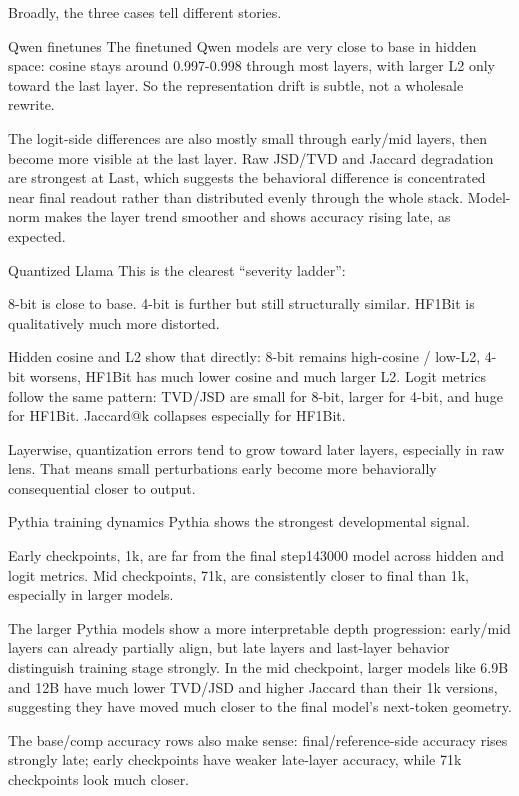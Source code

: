 Broadly, the three cases tell different stories.

Qwen finetunes
The finetuned Qwen models are very close to base in hidden space: cosine stays around 0.997-0.998 through most layers, with larger L2 only toward the last layer. So the representation drift is subtle, not a wholesale rewrite.

The logit-side differences are also mostly small through early/mid layers, then become more visible at the last layer. Raw JSD/TVD and Jaccard degradation are strongest at Last, which suggests the behavioral difference is concentrated near final readout rather than distributed evenly through the whole stack. Model-norm makes the layer trend smoother and shows accuracy rising late, as expected.

Quantized Llama
This is the clearest “severity ladder”:

8-bit is close to base.
4-bit is further but still structurally similar.
HF1Bit is qualitatively much more distorted.

Hidden cosine and L2 show that directly: 8-bit remains high-cosine / low-L2, 4-bit worsens, HF1Bit has much lower cosine and much larger L2. Logit metrics follow the same pattern: TVD/JSD are small for 8-bit, larger for 4-bit, and huge for HF1Bit. Jaccard@k collapses especially for HF1Bit.

Layerwise, quantization errors tend to grow toward later layers, especially in raw lens. That means small perturbations early become more behaviorally consequential closer to output.

Pythia training dynamics
Pythia shows the strongest developmental signal.

Early checkpoints, 1k, are far from the final step143000 model across hidden and logit metrics. Mid checkpoints, 71k, are consistently closer to final than 1k, especially in larger models.

The larger Pythia models show a more interpretable depth progression: early/mid layers can already partially align, but late layers and last-layer behavior distinguish training stage strongly. In the mid checkpoint, larger models like 6.9B and 12B have much lower TVD/JSD and higher Jaccard than their 1k versions, suggesting they have moved much closer to the final model’s next-token geometry.

The base/comp accuracy rows also make sense: final/reference-side accuracy rises strongly late; early checkpoints have weaker late-layer accuracy, while 71k checkpoints look much closer.

